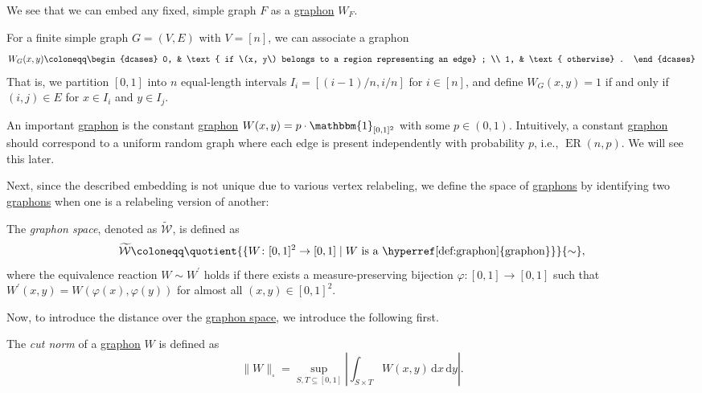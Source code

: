 We see that we can embed any fixed, simple graph \(F\) as a \hyperref[def:graphon]{graphon} \(W_F\).

\begin{eg}
	For a finite simple graph \(G = (V, E)\) with \(V = [n]\), we can associate a graphon
	\[
		W_G(x, y)
		\coloneqq \begin{dcases}
			0, & \text{ if \(x, y\) belongs to a region representing an edge} ; \\
			1, & \text{ otherwise} .
		\end{dcases}
	\]
	That is, we partition \([0, 1]\) into \(n\) equal-length intervals \(I_i = [(i-1) / n, i / n]\) for \(i \in [n]\), and define \(W_G(x, y) = 1\) if and only if \((i, j) \in E\) for \(x \in I_i\) and \(y \in I_j\).
\end{eg}

\begin{eg}
	An important \hyperref[def:graphon]{graphon} is the constant \hyperref[def:graphon]{graphon} \(W(x, y) = p\cdot \mathbbm{1}_{[0, 1]^2} \) with some \(p \in (0, 1)\). Intuitively, a constant \hyperref[def:graphon]{graphon} should correspond to a uniform random graph where each edge is present independently with probability \(p\), i.e., \(\operatorname{ER}(n, p) \). We will see this later.
\end{eg}

Next, since the described embedding is not unique due to various vertex relabeling, we define the space of \hyperref[def:graphon]{graphons} by identifying two \hyperref[def:graphon]{graphons} when one is a relabeling version of another:

\begin{definition}\label{def:graphon-space}
	The \emph{graphon space}, denoted as \(\widetilde{\mathcal{W} } \), is defined as
	\[
		\widetilde{\mathcal{W} }
		\coloneqq \quotient{\{ W\colon [0, 1]^2 \to [0, 1] \mid W \text{ is a \hyperref[def:graphon]{graphon}} \}}{\sim } ,
	\]
	where the equivalence reaction \(W \sim W^{\prime} \) holds if there exists a measure-preserving bijection \(\varphi \colon [0, 1] \to [0, 1]\) such that \(W^{\prime} (x, y) = W(\varphi (x), \varphi (y))\) for almost all \((x, y) \in [0, 1]^2\).
\end{definition}

Now, to introduce the distance over the \hyperref[def:graphon-space]{graphon space}, we introduce the following first.

\begin{definition}\label{def:cut-norm}
	The \emph{cut norm} of a \hyperref[def:graphon]{graphon} \(W\) is defined as
	\[
		\lVert W \rVert _{\square }
		= \sup _{S, T \subseteq [0, 1]} \left\lvert \int _{S \times T} W(x, y) \,\mathrm{d} x \,\mathrm{d} y \right\rvert .
	\]
\end{definition}

